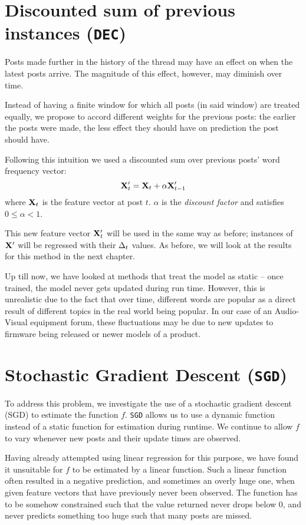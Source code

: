 \section{Discounted sum of previous instances (\texttt{DEC})}
 
Posts made further in the history of the thread may have an effect on when the 
latest posts arrive. The magnitude of this effect, however, may diminish over 
time.

Instead of having a finite window for which all posts (in said window) are 
treated equally, we propose to accord different weights for the previous posts: the earlier the posts were made, the less effect they should have on prediction 
the post should have.

Following this intuition we used a discounted sum over previous posts' word 
frequency vector:
\[
	\mathbf{X}'_t = \mathbf{X}_t + \alpha \mathbf{X}'_{t-1}
\]
where $\mathbf{X}_t$ is the feature vector at post $t$. $\alpha$ is the \emph{discount 
factor} and satisfies $0 \leq \alpha < 1$.

This new feature vector $\mathbf{X}'_t$ will be used in the same way as before; 
instances of $\mathbf{X}'$ will be regressed with their $\Delta_t$ values. As before, we will 
look at the results for this method in the next chapter.

Up till now, we have looked at methods that treat the model as static -- once 
trained, the model never gets updated during run time. However, this is 
unrealistic due to the fact that over time, different words are popular as a 
direct result of different topics in the real world being popular. In our case 
of an Audio-Visual equipment forum, these fluctuations may be due to new updates 
to firmware being released or newer models of a product.

\section{Stochastic Gradient Descent (\texttt{SGD})}
To address this problem, we investigate the use of a stochastic gradient descent 
(SGD) to estimate the function $f$.  \texttt{SGD} allows us to use a dynamic 
function instead of a static function for estimation during runtime.  We 
continue to allow $f$ to vary whenever new posts and their update times are 
observed.

Having already attempted using linear regression for this purpose, we have found 
it unsuitable for $f$ to be estimated by a linear function. Such a linear 
function often resulted in a negative prediction, and sometimes an 
overly huge one, when given feature vectors that have previously never been 
observed. The function has to be somehow constrained such that the value 
returned never drops below 0, and never predicts something too huge such that 
many posts are missed.

